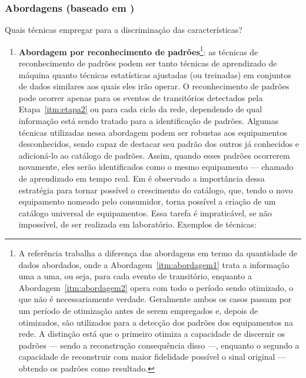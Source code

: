 \subsubsection[Abordagens]{Abordagens (baseado em 
\cite{nilm_liang_pt1_2010_34,nilm_zeifman_review_2011})}
\label{top:abordagens}

Quais técnicas empregar para a discriminação das características?

\begin{enumerate}[label={Abordagem} \arabic* - ,ref=\arabic*,align=left]
\item\label{itm:abordagem1}\textbf{Abordagem por reconhecimento de
padrões}\footnote{A referência \cite{nilm_zeifman_review_2011}
trabalha a diferença das abordagens em termo da quantidade de dados
abordados, onde a Abordagem~\ref{itm:abordagem1} trata a informação
uma a uma, ou seja, para cada evento de transitório, enquanto a
Abordagem~\ref{itm:abordagem2} opera com todo o período sendo
otimizado, o que não é necessariamente verdade. Geralmente ambos os casos passam
por um período de otimização antes de serem empregados e, depois de
otimizados, são utilizados para a detecção dos padrões dos equipamentos
na rede. A distinção está que o primeiro otimiza a capacidade de
discernir os padrões --- sendo a reconstrução consequência disso ---,
enquanto o segundo a capacidade de reconstruir com maior fidelidade
possível o sinal original --- obtendo os padrões como
resultado.\label{fn:diff_abordagens}}: as técnicas de reconhecimento
de padrões podem ser tanto técnicas de aprendizado de máquina quanto
técnicas estatísticas ajustadas (ou treinadas) em conjuntos de dados similares
aos quais eles irão operar. O reconhecimento de padrões pode ocorrer
apenas para os eventos de transitórios detectados pela
Etapa~\ref{itm:etapa2} ou para cada ciclo da rede, dependendo de qual
informação está sendo tratado para a
identificação de padrões. Algumas técnicas utilizadas nessa abordagem
podem ser robustas aos equipamentos desconhecidos, sendo capaz de
destacar seu padrão dos outros já conhecidos e adicioná-lo ao catálogo
de padrões. Assim, quando esses padrões ocorrerem novamente, eles
serão identificados como o mesmo equipamento --- chamado de aprendizado
em tempo real. Em \cite{nilm_matthews_overview_2008_22} é observado a
importância dessa estratégia para tornar possível o crescimento do
catálogo, que, tendo o novo equipamento nomeado pelo consumidor, torna
possível a criação de um catálogo universal de equipamentos. Essa
tarefa é impraticável, se não impossível, de ser realizada em
laboratório. Exemplos de técnicas:

\end{enumerate}

